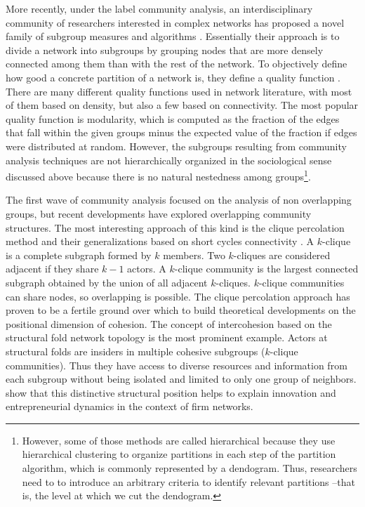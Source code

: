 More recently, under the label community analysis, an interdisciplinary community of researchers interested in complex networks has proposed a novel family of subgroup measures and algorithms \citep{fortunato:2010}. Essentially their approach is to divide a network into subgroups by grouping nodes that are more densely connected among them than with the rest of the network. To objectively define how good a concrete partition of a network is, they define a quality function \citep{brandes:2005,fortunato:2010}. There are many different quality functions used in network literature, with most of them based on density, but also a few based on connectivity. The most popular quality function is modularity, which is computed as the fraction of the edges that fall within the given groups minus the expected value of the fraction if edges were distributed at random. However, the subgroups resulting from community analysis techniques are not hierarchically organized in the sociological sense discussed above because there is no natural nestedness among groups\footnote{However, some of those methods are called hierarchical because they use hierarchical clustering to organize partitions in each step of the partition algorithm, which is commonly represented by a dendogram. Thus, researchers need to to introduce an arbitrary criteria to identify relevant partitions --that is, the level at which we cut the dendogram.}.

The first wave of community analysis focused on the analysis of non overlapping groups, but recent developments have explored overlapping community structures. The most interesting approach of this kind is the clique percolation method \citep*{palla:2005} and their generalizations based on short cycles connectivity \citep{batagelj:2007}. A $k$-clique is a complete subgraph formed by $k$ members. Two $k$-cliques are considered adjacent if they share $k-1$ actors. A $k$-clique community is the largest connected subgraph obtained by the union of all adjacent $k$-cliques. $k$-clique communities can share nodes, so overlapping is possible. The clique percolation approach has proven to be a fertile ground over which to build theoretical developments on the positional dimension of cohesion. The concept of intercohesion based on the structural fold network topology \citep{stark:2010} is the most prominent example. Actors at structural folds are insiders in multiple cohesive subgroups ($k$-clique communities). Thus they have access to diverse resources and information from each subgroup without being isolated and limited to only one group of neighbors. \citeauthor{stark:2010} show that this distinctive structural position helps to explain innovation and entrepreneurial dynamics in the context of firm networks.

